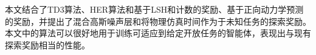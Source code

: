 \begin{conclusions}

    本文结合了TD3算法、HER算法和基于LSH和计数的奖励、基于正向动力学预测的奖励，并提出了混合高斯噪声层和将物理仿真时间作为于未知任务的探索奖励。本文中的算法可以很好地用于训练可适应到给定开放任务的智能体，表现出与现有探索奖励相当的性能。
\end{conclusions}
